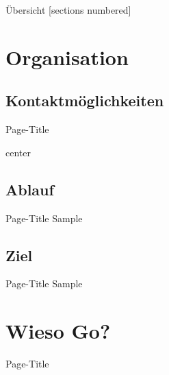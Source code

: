 

\usepackage{tikz}
\usepackage{hyperref}
\hypersetup{
	colorlinks=true,
	linkcolor=darkgray,
	urlcolor=blue,
}



\maketitle

\begin{frame}{Übersicht}
	[sections numbered]
	\tableofcontents[hideallsubsections]
\end{frame}



\section{Organisation}

\subsection{Kontaktmöglichkeiten}
\begin{frame}{Page-Title}
	\begin{center}
		center
	\end{center}
\end{frame}

\subsection{Ablauf}
\begin{frame}{Page-Title}
	Sample
\end{frame}

\subsection{Ziel}
\begin{frame}{Page-Title}
	Sample
\end{frame}



\section{Wieso Go?}
\begin{frame}{Page-Title}
	
\end{frame}


